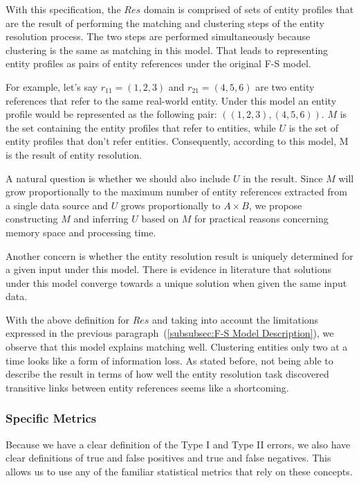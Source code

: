 With this specification, the $Res$ domain is comprised of sets of entity
profiles that are the result of performing the matching and clustering steps of
the entity resolution process.
The two steps are performed simultaneously because clustering is the same as
matching in this model.
That leads to representing entity profiles as pairs of entity references under
the original F-S model.

For example, let's say $r_{11}=(1, 2, 3)$ and $r_{21}=(4, 5, 6)$ are two entity
references that refer to the same real-world entity.
Under this model an entity profile would be represented as the following pair:
$((1, 2, 3), (4, 5, 6))$.
$M$ is the set containing the entity profiles that refer to entities, while
$U$ is the set of entity profiles that don't refer entities.
Consequently, according to this model, M is the result of entity resolution.

A natural question is whether we should also include $U$ in the result.
Since $M$ will grow proportionally to the maximum number of entity references
extracted from a single data source and $U$ grows proportionally to
$A \times B$, we propose constructing $M$ and inferring $U$ based on $M$ for
practical reasons concerning memory space and processing time.

Another concern is whether the entity resolution result is uniquely determined
for a given input under this model.
There is evidence in literature that solutions under this model converge towards
a unique solution when given the same input data\cite{winkler2014matching}.

With the above definition for $Res$ and taking into account the limitations
expressed in the previous paragraph~(\ref{subsubsec:F-S Model Description}),
we observe that this model explains matching well.
Clustering entities only two at a time looks like a form of information loss.
As stated before, not being able to describe the result in terms of how well the
entity resolution task discovered transitive links between entity references
seems like a shortcoming.

\subsubsection{Specific Metrics}\label{subsubsec:F-S Quality Metrics}

Because we have a clear definition of the Type I and Type II errors, we also
have clear definitions of true and false positives and true and false negatives.
This allows us to use any of the familiar statistical metrics that rely on
these concepts.

